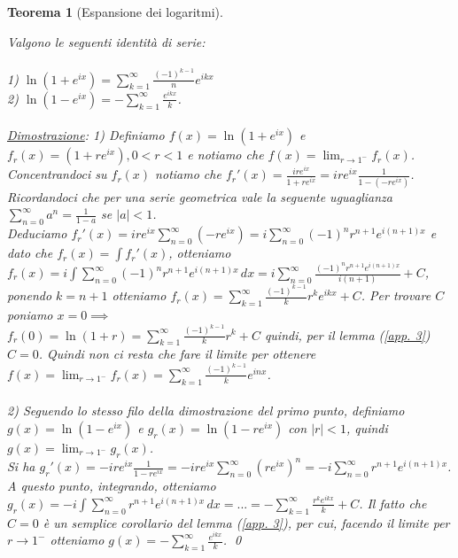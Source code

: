 \documentclass[a4paper,12pt]{report}
\newtheorem{teorema}{Teorema}[chapter]
\newcommand{\lt}{<}
\begin{document}
\begin{teorema}[Espansione dei logaritmi]\label{app. 19}
    
    Valgono le seguenti identità di serie: 
    \\
    \\1) $\ln(1+e^{ix})=\displaystyle\sum_{k=1}^\infty\frac{(-1)^{k-1}}{n}e^{ikx}$ 
    \\2) $\ln(1-e^{ix})=-\sum_{k=1}^\infty\frac{e^{ikx}}{k}$.
    \\
    \\
    \underline{Dimostrazione}: 1) Definiamo $f(x)=\ln(1+e^{ix})$ e $f_r(x)=(1+re^{ix}), 0 \lt r \lt 1$ e notiamo che $f(x)=\displaystyle\lim_{r\to 1^-}f_r(x)$.
    \\Concentrandoci su $f_r(x)$ notiamo che $f_r'(x)=\displaystyle\frac{ire^{ix}}{1+re^{ix}}=ire^{ix}\frac{1}{1-(-re^{ix})}$. Ricordandoci che per una serie geometrica vale la seguente uguaglianza $\displaystyle\sum_{n=0}^\infty a^n=\frac{1}{1-a}$ se $|a|\lt 1 $.
    \\Deduciamo $ f_r'(x)=ire^{ix}\displaystyle\sum_{n=0}^\infty(-re^{ix})= i\sum_{n=0}^\infty(-1)^nr^{n+1}e^{i(n+1)x}$ e dato che $f_r(x)=\displaystyle\int f_r'(x)$, otteniamo $f_r(x)=i\displaystyle\int\sum_{n=0}^\infty(-1)^nr^{n+1}e^{i(n+1)x}\,dx=i\sum_{n=0}^\infty\frac{(-1)^nr^{n+1}e^{i(n+1)x}}{i(n+1)}+C$, ponendo $k=n+1$ otteniamo $f_r(x)=\displaystyle\sum_{k=1}^\infty\frac{(-1)^{k-1}}{k}r^ke^{ikx}+C$. Per trovare $C$ poniamo $x=0\implies$
    \\ $f_r(0)=\ln(1+r)=\displaystyle\sum_{k=1}^\infty\frac{(-1)^{k-1}}{k}r^k+C$ quindi, per il lemma (\ref{app. 3}) $C=0$. Quindi non ci resta che fare il limite per ottenere $f(x)=\displaystyle\lim_{r\to1^-}f_r(x)=\sum_{k=1}^\infty\frac{(-1)^{k-1}}{k}e^{inx}$.
    \\
    \\ 2) Seguendo lo stesso filo della dimostrazione del primo punto, definiamo $g(x)=\ln(1-e^{ix})$ e $g_r(x)=\ln(1-re^{ix})$ con $|r|\lt 1$, quindi $g(x)=\displaystyle\lim_{r\to1^-}g_r(x)$. 
    \\ Si ha $g_r'(x)=-ire^{ix}\displaystyle\frac{1}{1-re^{ix}}=-ire^{ix}\sum_{n=0}^\infty(re^{ix})^n=-i\sum_{n=0}^\infty r^{n+1}e^{i(n+1)x}$. A questo punto, integrando, otteniamo $g_r(x)=-i\displaystyle\int\sum_{n=0}^\infty r^{n+1}e^{i(n+1)x} \,dx=...=-\sum_{k=1}^\infty \frac{r^ke^{ikx}}{k}+C$.  Il fatto che $C=0$ è un semplice corollario del lemma (\ref{app. 3}), per cui, facendo il limite per $r\to1^-$ otteniamo $g(x)=-\displaystyle\sum_{k=1}^\infty\frac{e^{ikx}}{k}$. \qed
    
\end{teorema}
\end{document}
